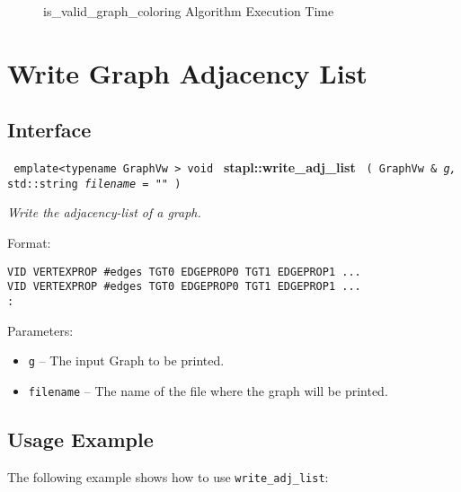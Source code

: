 \begin{figure}[p]
\caption{ is\_valid\_graph\_coloring Algorithm Execution Time}
\label{fig:is-valid-color-alg-exec-exper}
\end{figure}


\section{ Write Graph Adjacency List}
\label{sec-wr-adj-list-alg}

\subsection{Interface} \label{sec-wr-adj-list-alg-inter}

\noindent
\texttt{%
emplate<typename GraphVw >
\newline
void 
}
\newline
\textbf{stapl::write\_adj\_list}%
\newline
\texttt{%
(
GraphVw \&
\textit{g,}%
std::string
\textit{filename = ""}%
)     
}
\vspace{0.4cm}

\textit{
Write the adjacency-list of a graph.
}
\vspace{0.4cm}

Format:
\begin{verbatim}
VID VERTEXPROP #edges TGT0 EDGEPROP0 TGT1 EDGEPROP1 ...
VID VERTEXPROP #edges TGT0 EDGEPROP0 TGT1 EDGEPROP1 ...
:
\end{verbatim}

Parameters:
\begin{itemize}
\item
\texttt{g} --
The input Graph to be printed.
\item
\texttt{filename} --
The name of the file where the graph will be printed.
\end{itemize}

\subsection{Usage Example} \label{sec-wr-adj-list-alg-use}

The following example shows how to use 
\texttt{write\_adj\_list}:


